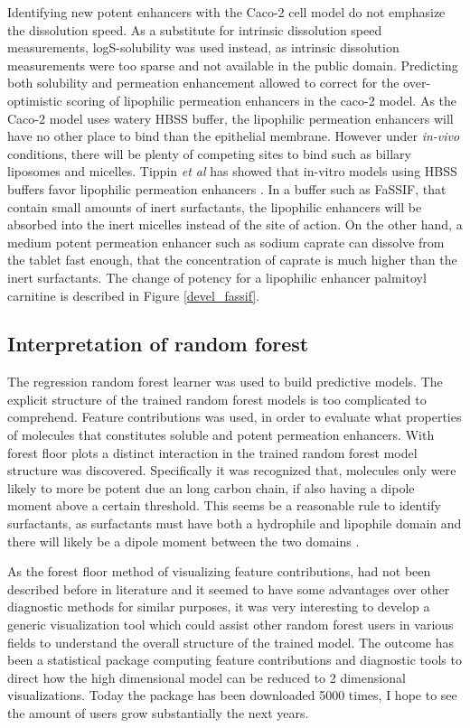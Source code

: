 Identifying new potent enhancers with the Caco-2 cell model do not emphasize the dissolution speed. As a substitute for intrinsic dissolution speed measurements, logS-solubility was used instead, as intrinsic dissolution measurements were too sparse and not available in the public domain. Predicting both solubility and permeation enhancement allowed to correct for the over-optimistic scoring of lipophilic permeation enhancers in the caco-2 model. As the Caco-2 model uses watery HBSS buffer, the lipophilic permeation enhancers will have no other place to bind than the epithelial membrane. However under \textit{in-vivo} conditions, there will be plenty of competing sites to bind such as billary liposomes and micelles. Tippin \textit{et al} has showed that in-vitro models using HBSS buffers favor lipophilic permeation enhancers \cite{tippin2008biorelevant}. In a buffer such as FaSSIF, that contain small amounts of inert surfactants, the lipophilic enhancers will be absorbed into the inert micelles instead of the site of action. On the other hand, a medium potent permeation enhancer such as sodium caprate can dissolve from the tablet fast enough, that the concentration of caprate is much higher than the inert surfactants. The change of potency for a lipophilic enhancer palmitoyl carnitine is described in Figure \ref{devel_fassif}.


\subsection{Interpretation of random forest}
The regression random forest learner was used to build predictive models. The explicit structure of the trained random forest models is too complicated to comprehend. Feature contributions was used, in order to evaluate what properties of molecules that constitutes soluble and potent permeation enhancers. With forest floor plots a distinct interaction in the trained random forest model structure was discovered. Specifically it was recognized that, molecules only were likely to more be potent due an long carbon chain, if also having a dipole moment above a certain threshold. This seems be a reasonable rule to identify surfactants, as surfactants must have both a hydrophile and lipophile domain and there will likely be a dipole moment between the two domains \cite{rosen2012surfactants}.

As the forest floor method of visualizing feature contributions, had not been described before in literature and it seemed to have some advantages over other diagnostic methods for similar purposes, it was very interesting to develop a generic visualization tool which could assist other random forest users in various fields to understand the overall structure of the trained model. The outcome has been a statistical package computing feature contributions and diagnostic tools to direct how the high dimensional model can be reduced to 2 dimensional visualizations. Today the package has been downloaded 5000 times, I hope to see the amount of users grow substantially the next years.